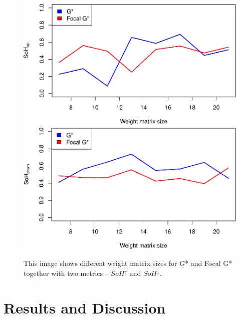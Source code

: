 \documentclass{itatnew}
\begin{document}
\begin{figure}[htp]
  \includegraphics[width=.45\linewidth]{images/gen-blur-sohup-1}
  \hspace{1em}
  \includegraphics[width=.45\linewidth]{images/gen-blur-sohdown-1}
  
  \caption{
    This image shows different weight matrix sizes for G* and Focal G* together 
    with two metrics -- $SoH^\uparrow$ and $SoH^\downarrow$.
  }
  \label{fig:Blur}
\end{figure}

\section{Results and Discussion}

%
\end{document}
